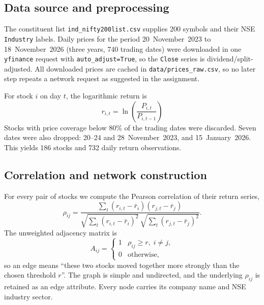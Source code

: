 \documentclass[11pt,a4paper]{article}
\begin{document}
\subsection{Data source and preprocessing}
The constituent list \texttt{ind\_nifty200list.csv} supplies 200 symbols and
their NSE \texttt{Industry} labels. Daily prices for the period 20~November~2023 to
18~November~2026 (three years, 740 trading dates) were downloaded in one
\texttt{yfinance} request with \texttt{auto\_adjust=True}, so the
\texttt{Close} series is dividend/split-adjusted. All downloaded prices are cached in
\texttt{data/prices\_raw.csv}, so no later step repeats a network request as suggested in the assignment.

% 

For stock $i$ on day $t$, the logarithmic return is
\begin{equation}
  r_{i,t}=\ln\!\left(\frac{P_{i,t}}{P_{i,t-1}}\right)
  \label{eq:returns}
\end{equation}
Stocks with price coverage below $80\%$ of the
trading dates were discarded. Seven dates were also dropped: 20--24 and
28~November~2023, and 15~January~2026. This yields 186 stocks and 732 daily
return observations.



\subsection{Correlation and network construction}
For every pair of stocks we compute the Pearson correlation of their return
series,
\begin{equation}
  \rho_{ij}=\frac{\sum_t (r_{i,t}-\bar r_i)(r_{j,t}-\bar r_j)}
                 {\sqrt{\sum_t (r_{i,t}-\bar r_i)^2}\,
                  \sqrt{\sum_t (r_{j,t}-\bar r_j)^2}}.
  \label{eq:pearson}
\end{equation}
The unweighted adjacency matrix is
\begin{equation}
  A_{ij}=\begin{cases}
    1 & \rho_{ij}\ge r,\; i\ne j,\\
    0 & \text{otherwise},
  \end{cases}
  \label{eq:adjacency}
\end{equation}
so an edge means ``these two stocks moved together more strongly than the
chosen threshold $r$''. The graph is simple and undirected, and the underlying
$\rho_{ij}$ is retained as an edge attribute. Every node carries its company
name and NSE industry sector.
\end{document}
